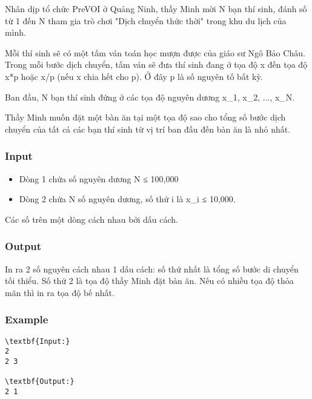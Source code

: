 

Nhân dịp tổ chức PreVOI ở Quảng Ninh, thầy Minh mời N bạn thí sinh, đánh số từ 1 đến N tham gia trò chơi "Dịch chuyển thức thời" trong khu du lịch của mình.

Mỗi thí sinh sẽ có một tấm ván toán học mượn được của giáo sư Ngô Bảo Châu. Trong mỗi bước dịch chuyển, tấm ván sẽ đưa thí sinh đang ở tọa độ x đến tọa độ x*p hoặc x/p (nếu x chia hết cho p). Ở đây p là số nguyên tố bất kỳ.

Ban đầu, N bạn thí sinh đứng ở các tọa độ nguyên dương x\_1, x\_2, ..., x\_N.

Thầy Minh muốn đặt một bàn ăn tại một tọa độ sao cho tổng số bước dịch chuyển của tất cả các bạn thí sinh từ vị trí ban đầu đến bàn ăn là nhỏ nhất.

\subsubsection{Input}
\begin{itemize}
	\item Dòng 1 chứa số nguyên dương N ≤ 100,000
	\item Dòng 2 chứa N số nguyên dương, số thứ i là x\_i ≤ 10,000.
\end{itemize}

Các số trên một dòng cách nhau bởi dấu cách.

\subsubsection{Output}

In ra 2 số nguyên cách nhau 1 dấu cách: số thứ nhất là tổng số bước di chuyển tối thiểu. Số thứ 2 là tọa độ thầy Minh đặt bàn ăn. Nếu có nhiều tọa độ thỏa mãn thì in ra tọa độ bế nhất.

\subsubsection{Example}
\begin{verbatim}
\textbf{Input:}
2
2 3

\textbf{Output:}
2 1\end{verbatim}